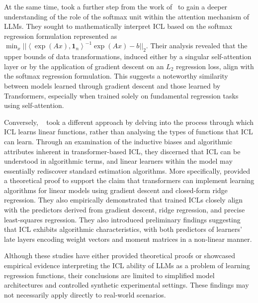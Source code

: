 At the same time, \citet{Li2023TheCO} took a further step from the work of~\cite{Garg2022WhatCT} to gain a deeper understanding of the role of the softmax unit within the attention mechanism of LLMs. They sought to mathematically interpret ICL based on the softmax regression formulation represented as $\min _x||\left\langle\exp (A x), \mathbf{1}_n\right\rangle^{-1} \exp (A x)-b||_2$.
Their analysis revealed that the upper bounds of data transformations, induced either by a singular self-attention layer or by the application of gradient descent on an $L_2$ regression loss, align with the softmax regression formulation. 
This suggests a noteworthy similarity between models learned through gradient descent and those learned by Transformers, especially when trained solely on fundamental regression tasks using self-attention.

Conversely, ~\citet{Akyrek2023WhatLA} took a different approach by delving into the process through which ICL learns linear functions, rather than analysing the types of functions that ICL can learn.
Through an examination of the inductive biases and algorithmic attributes inherent in transformer-based ICL, they discerned that ICL can be understood in algorithmic terms, and linear learners within the model may essentially rediscover standard estimation algorithms.
More specifically, \citet{Akyrek2023WhatLA} provided a theoretical proof to support the claim that transformers can implement learning algorithms for linear models using gradient descent and closed-form ridge regression. They also empirically demonstrated that trained ICLs closely align with the predictors derived from gradient descent, ridge regression, and precise least-squares regression. 
They also introduced preliminary findings suggesting that ICL exhibits algorithmic characteristics, with both predictors of learners’ late layers encoding weight vectors and moment matrices in a non-linear manner.

Although these studies have either provided theoretical proofs or showcased empirical evidence interpreting the ICL ability of LLMs as a problem of learning regression functions, their conclusions are limited to simplified model architectures and controlled synthetic experimental settings. These findings may not necessarily apply directly to real-world scenarios.

